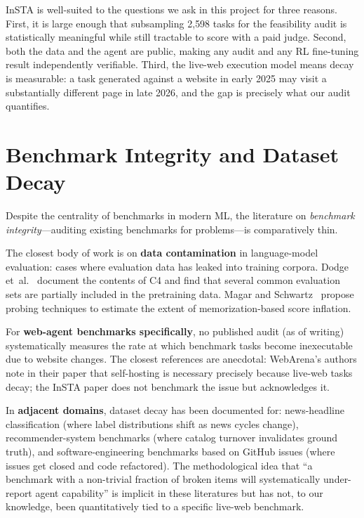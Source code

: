 \documentclass[12pt,a4paper]{report}
\begin{document}
InSTA is well-suited to the questions we ask in this project for three reasons. First, it is large enough that subsampling 2{,}598 tasks for the feasibility audit is statistically meaningful while still tractable to score with a paid judge. Second, both the data and the agent are public, making any audit and any RL fine-tuning result independently verifiable. Third, the live-web execution model means decay is measurable: a task generated against a website in early 2025 may visit a substantially different page in late 2026, and the gap is precisely what our audit quantifies.

\section{Benchmark Integrity and Dataset Decay}\label{sec:lit-decay}

Despite the centrality of benchmarks in modern ML, the literature on \emph{benchmark integrity}---auditing existing benchmarks for problems---is comparatively thin.

The closest body of work is on \textbf{data contamination} in language-model evaluation: cases where evaluation data has leaked into training corpora. Dodge et~al.~\cite{dodge2021c4} document the contents of C4 and find that several common evaluation sets are partially included in the pretraining data. Magar and Schwartz~\cite{magar2022contamination} propose probing techniques to estimate the extent of memorization-based score inflation.

For \textbf{web-agent benchmarks specifically}, no published audit (as of writing) systematically measures the rate at which benchmark tasks become inexecutable due to website changes. The closest references are anecdotal: WebArena's authors note in their paper that self-hosting is necessary precisely because live-web tasks decay; the InSTA paper does not benchmark the issue but acknowledges it.

In \textbf{adjacent domains}, dataset decay has been documented for: news-headline classification (where label distributions shift as news cycles change), recommender-system benchmarks (where catalog turnover invalidates ground truth), and software-engineering benchmarks based on GitHub issues (where issues get closed and code refactored). The methodological idea that ``a benchmark with a non-trivial fraction of broken items will systematically under-report agent capability'' is implicit in these literatures but has not, to our knowledge, been quantitatively tied to a specific live-web benchmark.
\end{document}
